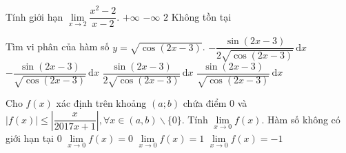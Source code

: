 \begin{ex}%
	Tính giới hạn $\lim\limits_{x\to 2} \dfrac{x^2 - 2}{x-2}$.
	\choice
	{$+\infty$}
	{$-\infty$}
	{$2$}
	{\True Không tồn tại}
\end{ex}

\begin{ex}%
	Tìm vi phân của hàm số  $y = \sqrt{\cos(2x - 3)}$.
	\choice
	{$-\dfrac{\sin (2x - 3)} {2\sqrt{\cos( 2x - 3)}}  \mathrm{\,d} x$}
	{\True $-\dfrac{\sin (2x - 3)} {\sqrt{\cos( 2x - 3)}}  \mathrm{\,d} x$}
	{$\dfrac{\sin (2x - 3)} {2\sqrt{\cos( 2x - 3)}}  \mathrm{\,d} x$}
	{$\dfrac{\sin (2x - 3)} {\sqrt{\cos( 2x - 3)}}  \mathrm{\,d} x$}
\end{ex}

\begin{ex}%
	Cho $f(x)$ xác định trên khoảng $(a; b)$ chứa điểm $0$ và $|f(x)| \le \left| \dfrac {x}{2017x + 1}\right|, \forall x \in (a,b) \backslash \text{\{0\}}$. Tính $\lim\limits_{x\to 0} f(x)$.	
	\choice
	{Hàm số không có giới hạn tại $0$}
	{\True $\lim\limits_{x\to 0} f(x) = 0$}
	{$\lim\limits_{x\to 0} f(x) = 1$}
	{$\lim\limits_{x\to 0} f(x) = -1$}
\end{ex}

